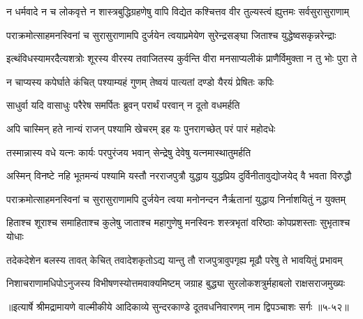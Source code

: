 \twolineshloka
{न धर्मवादे न च लोकवृत्ते न शास्त्रबुद्धिग्रहणेषु वापि}
{विद्येत कश्चित्तव वीर तुल्यस्त्वं ह्युत्तमः सर्वसुरासुराणाम्} %

\twolineshloka
{पराक्रमोत्साहमनस्विनां च सुरासुराणामपि दुर्जयेन}
{त्वयाप्रमेयेण सुरेन्द्रसङ्घा जिताश्च युद्धेष्वसकृन्नरेन्द्राः} %

\twolineshloka
{इत्थंविधस्यामरदैत्यशत्रोः शूरस्य वीरस्य तवाजितस्य}
{कुर्वन्ति वीरा मनसाप्यलीकं प्राणैर्विमुक्ता न तु भोः पुरा ते} %

\twolineshloka
{न चाप्यस्य कपेर्घाते कंचित् पश्याम्यहं गुणम्}
{तेष्वयं पात्यतां दण्डो यैरयं प्रेषितः कपिः} %

\twolineshloka
{साधुर्वा यदि वासाधुः परैरेष समर्पितः}
{ब्रुवन् परार्थं परवान् न दूतो वधमर्हति} %

\twolineshloka
{अपि चास्मिन् हते नान्यं राजन् पश्यामि खेचरम्}
{इह यः पुनरागच्छेत् परं पारं महोदधेः} %

\twolineshloka
{तस्मान्नास्य वधे यत्नः कार्यः परपुरंजय}
{भवान् सेन्द्रेषु देवेषु यत्नमास्थातुमर्हति} %

\twolineshloka
{अस्मिन् विनष्टे नहि भूतमन्यं पश्यामि यस्तौ नरराजपुत्रौ}
{युद्धाय युद्धप्रिय दुर्विनीतावुद्योजयेद् वै भवता विरुद्धौ} %

\twolineshloka
{पराक्रमोत्साहमनस्विनां च सुरासुराणामपि दुर्जयेन}
{त्वया मनोनन्दन नैर्ऋतानां युद्धाय निर्नाशयितुं न युक्तम्} %

\twolineshloka
{हिताश्च शूराश्च समाहिताश्च कुलेषु जाताश्च महागुणेषु}
{मनस्विनः शस्त्रभृतां वरिष्ठाः कोपप्रशस्ताः सुभृताश्च योधाः} %

\twolineshloka
{तदेकदेशेन बलस्य तावत् केचित् तवादेशकृतोऽद्य यान्तु}
{तौ राजपुत्रावुपगृह्य मूढौ परेषु ते भावयितुं प्रभावम्} %

\twolineshloka
{निशाचराणामधिपोऽनुजस्य विभीषणस्योत्तमवाक्यमिष्टम्}
{जग्राह बुद्ध्या सुरलोकशत्रुर्महाबलो राक्षसराजमुख्यः} %


॥इत्यार्षे श्रीमद्रामायणे वाल्मीकीये आदिकाव्ये सुन्दरकाण्डे दूतवधनिवारणम् नाम द्विपञ्चाशः सर्गः ॥५-५२॥
